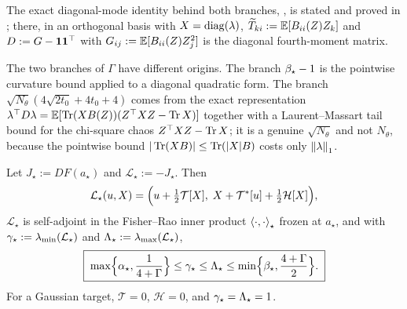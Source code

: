 The exact diagonal-mode identity behind both branches, , is stated
and proved in ; there, in an orthogonal basis with $X=\operatorname{diag}(\lambda)$,
$\widetilde T_{ki}:=\mathbb{E}[B_{ii}(Z)Z_k]$ and $D:=G-\mathbf{1}\mathbf{1}^\top$ with
$G_{ij}:=\mathbb{E}[B_{ii}(Z)Z_j^2]$ is the diagonal fourth-moment matrix.

The two branches of $\Gamma$ have different origins. The branch $\beta_\star-1$ is the pointwise
curvature bound applied to a diagonal quadratic form. The branch
$\sqrt{N_\theta}(4\sqrt{2t_0}+4t_0+4)$ comes from the exact representation
$\lambda^\top D\lambda=\mathbb{E}[\operatorname{Tr}(XB(Z))(Z^\top XZ-\operatorname{Tr} X)]$ together with a Laurent--Massart tail
bound for the chi-square chaos $Z^\top XZ-\operatorname{Tr} X$; it is a genuine $\sqrt{N_\theta}$ and not
$N_\theta$, because the pointwise bound $|\operatorname{Tr}(XB)|\leq\operatorname{Tr}(|X|B)$ costs only $\left\lVert \lambda\right\rVert_1$.

\begin{proposition}
\label{prop:spectral-sandwich}
Let $J_\star:=DF(a_\star)$ and $\mathcal L_\star:=-J_\star$. Then
\begin{equation}
\label{eq:Lstar-formula}
    \mathcal L_\star(u,X)
    =\Bigl(u+\tfrac12\mathcal T[X],\;X+\mathcal T^*[u]+\tfrac12\mathcal H[X]\Bigr),
\end{equation}
$\mathcal L_\star$ is self-adjoint in the Fisher--Rao inner product $\left\langle \cdot,\cdot\right\rangle_\star$
frozen at $a_\star$, and with $\gamma_\star:=\lambda_{\min}(\mathcal L_\star)$ and
$\Lambda_\star:=\lambda_{\max}(\mathcal L_\star)$,
\begin{equation}
\label{eq:linear-gap-bounds}
    \boxed{\;
    \max\Bigl\{\alpha_\star,\frac1{4+\Gamma}\Bigr\}
    \leq\gamma_\star\leq\Lambda_\star\leq
    \min\Bigl\{\beta_\star,\frac{4+\Gamma}2\Bigr\}.\;}
\end{equation}
For a Gaussian target, $\mathcal T=0$, $\mathcal H=0$, and $\gamma_\star=\Lambda_\star=1$.
\end{proposition}

